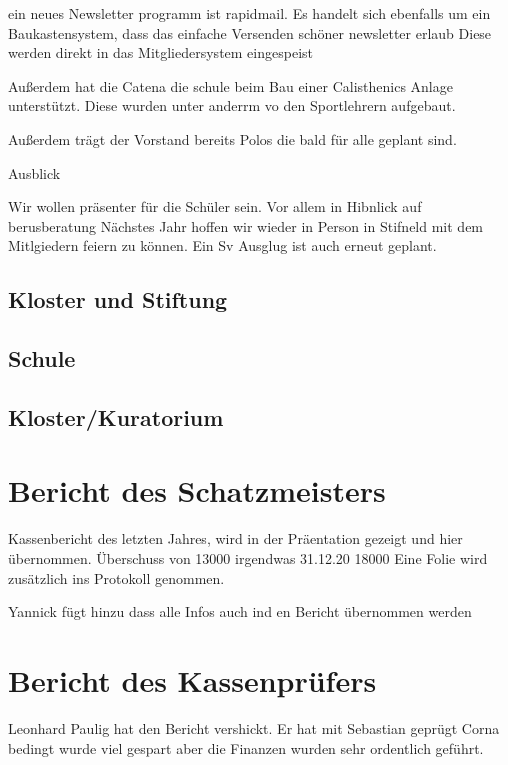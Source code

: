 \documentclass[a4paper, 11pt]{article}
\begin{document}
ein neues Newsletter programm ist rapidmail. Es handelt sich ebenfalls um ein Baukastensystem, dass das einfache Versenden schöner newsletter erlaub
Diese werden direkt in das Mitgliedersystem eingespeist

Außerdem hat die Catena die schule beim Bau einer Calisthenics Anlage unterstützt.
Diese wurden unter anderrm vo den Sportlehrern aufgebaut.

Außerdem trägt der Vorstand bereits Polos die bald für alle geplant sind.

Ausblick

Wir wollen präsenter für die Schüler sein. Vor allem in Hibnlick auf berusberatung
Nächstes Jahr hoffen wir wieder in Person in Stifneld mit dem Mitlgiedern feiern zu können.
Ein Sv Ausglug ist auch erneut geplant.



\subsection*{Kloster und Stiftung}



\subsection*{Schule}





\subsection*{Kloster/Kuratorium}



\section*{Bericht des Schatzmeisters}

Kassenbericht des letzten Jahres, wird in der Präentation gezeigt und hier übernommen.
Überschuss von 13000 irgendwas
31.12.20 18000
Eine Folie wird zusätzlich ins Protokoll genommen.

Yannick fügt hinzu dass alle Infos auch ind en Bericht übernommen werden

\section*{Bericht des Kassenprüfers}
Leonhard Paulig hat den Bericht vershickt.
Er hat mit Sebastian geprügt
Corna bedingt wurde viel gespart aber die Finanzen wurden sehr ordentlich geführt.
\end{document}

